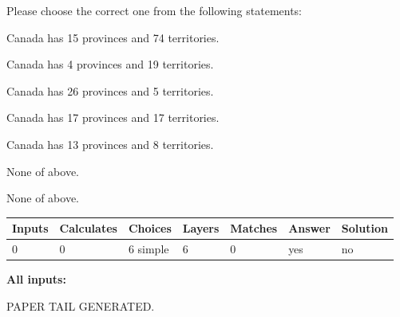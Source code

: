 \documentclass[12pt]{article}
\begin{document}
  
Please choose the correct one from the following statements:
 
 
Canada has  15 provinces and  74 territories.
 
 
Canada has   4 provinces and  19 territories.
 
 
Canada has  26 provinces and  5 territories.
 
 
Canada has  17 provinces and  17 territories.
 
 
Canada has  13 provinces and  8 territories.
 
 
 None of above.
 
 
\noindent{}
 
 
 None of above.
 
 
\noindent{}
 
 
   
   
   
   
\noindent\begin{tabular}{|l|l|l|l|l|l|l|}
 \hline
Inputs & Calculates & Choices & Layers & Matches & Answer & Solution \\ \hline
 0  & 
 0  & 
 6
  simple  
  & 
 6  & 
 0  & 
  yes & 
  no 
  \\ \hline
 \end{tabular}
   
   
   
   
\noindent{}
   
   
   
   
\noindent\vspace{0.1in}\hspace{-0.08in} {\textbf{\Large{All inputs: }}}
   
   
   
   
   
   
 \vspace{0.2in}
 
   
   
\vspace{2.0in} PAPER TAIL GENERATED.
   
   
   
\end{document}
